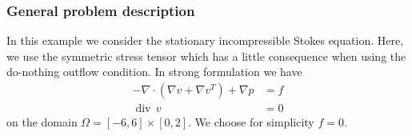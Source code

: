 \subsubsection{General problem description}
In this example we consider the stationary incompressible Stokes equation. Here,
we use the symmetric stress tensor which has a little consequence when using 
the do-nothing outflow condition. In strong formulation we have
\begin{align*}
-\nabla\cdot (\nabla v + \nabla v^{T}) + \nabla p &= f \\
\operatorname{div}\, v &= 0 
\end{align*}
on the domain $\Omega = [-6,6]\times [0,2]$. We choose for simplicity $f=0$.
